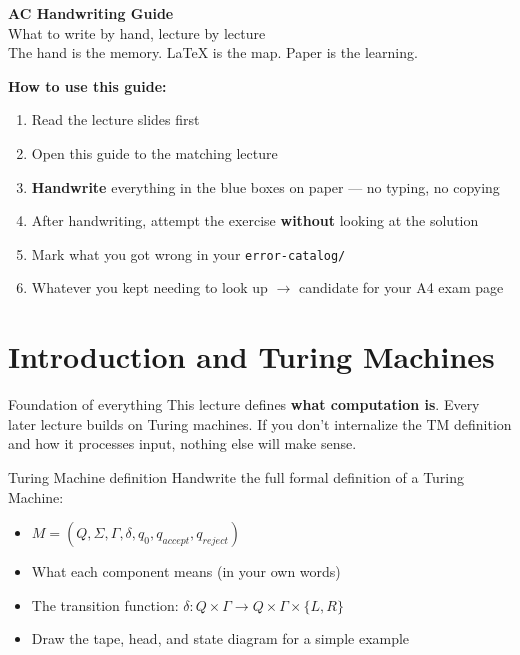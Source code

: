 \documentclass[11pt,a4paper]{article}
\begin{document}
\begin{center}
{\Huge\bfseries AC Handwriting Guide}\\[0.5em]
{\large What to write by hand, lecture by lecture}\\[0.3em]
{\large\color{warnred} The hand is the memory. LaTeX is the map. Paper is the learning.}
\end{center}

\vspace{0.5em}

\begin{tcolorbox}[colback=lightyellow, colframe=black!50]
\textbf{How to use this guide:}
\begin{enumerate}[nosep]
\item Read the lecture slides first
\item Open this guide to the matching lecture
\item \textbf{Handwrite} everything in the blue boxes on paper --- no typing, no copying
\item After handwriting, attempt the exercise \textbf{without} looking at the solution
\item Mark what you got wrong in your \texttt{error-catalog/}
\item Whatever you kept needing to look up $\rightarrow$ candidate for your A4 exam page
\end{enumerate}
\end{tcolorbox}

\section{Introduction and Turing Machines}

\begin{whybox}{Foundation of everything}
This lecture defines \textbf{what computation is}. Every later lecture builds on Turing machines. If you don't internalize the TM definition and how it processes input, nothing else will make sense.
\end{whybox}

\begin{writebox}{Turing Machine definition}
Handwrite the full formal definition of a Turing Machine:
\begin{itemize}[nosep]
\item $M = (Q, \Sigma, \Gamma, \delta, q_0, q_{accept}, q_{reject})$
\item What each component means (in your own words)
\item The transition function: $\delta: Q \times \Gamma \rightarrow Q \times \Gamma \times \{L, R\}$
\item Draw the tape, head, and state diagram for a simple example
\end{itemize}
\end{writebox}
\end{document}
